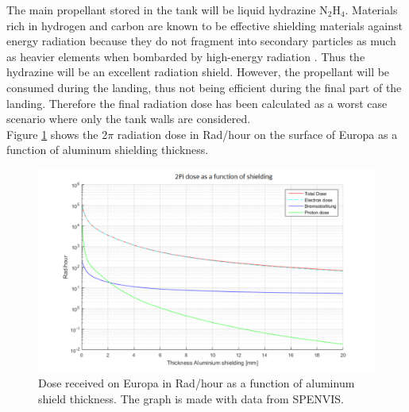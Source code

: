 The main propellant stored in the tank will be liquid hydrazine N$_2$H$_4$. Materials rich in hydrogen and carbon are known to be effective shielding materials against energy radiation because they do not fragment into secondary particles as much as heavier elements when bombarded by high-energy radiation \cite{rad_shield_2006}. Thus the hydrazine will be an excellent radiation shield. 
However, the propellant will be consumed during the landing, thus not being efficient during the final part of the landing. Therefore the final radiation dose has been calculated as a worst case scenario where only the tank walls are considered. \\

Figure \ref{fig:raddose} shows the 2$\pi$ radiation dose in Rad/hour on the surface of Europa as a function of aluminum shielding thickness. 

\begin{figure}
\begin{center}
\includegraphics[scale=0.5]{figures/navtheory/dose}
\caption{Dose received on Europa in Rad/hour as a function of aluminum shield thickness. The graph is made with data from SPENVIS.}
\label{fig:raddose}
\end{center}
\end{figure}

